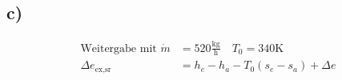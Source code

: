 

\subsection*{c)}
\begin{align*}
\text{Weitergabe mit } \dot{m} &= 520 \frac{\text{kg}}{\text{h}} \quad T_0 = 340 \text{K} \\
\Delta e_{\text{ex,sr}} &= h_e - h_a - T_0 (s_e - s_a) + \Delta e
\end{align*}